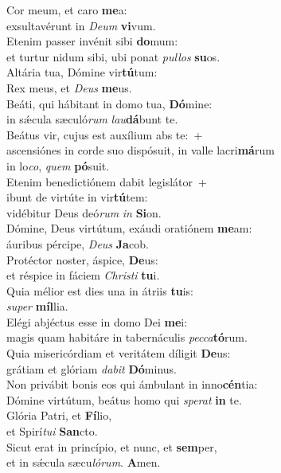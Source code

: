\evenverse Cor meum, et caro \textbf{me}a:~\*\\
\evenverse exsultavérunt in \textit{De}\textit{um} \textbf{vi}vum.\\
\oddverse Etenim passer invénit sibi \textbf{do}mum:~\*\\
\oddverse et turtur nidum sibi, ubi ponat \textit{pul}\textit{los} \textbf{su}os.\\
\evenverse Altária tua, Dómine vir\textbf{tú}tum:~\*\\
\evenverse Rex meus, et \textit{De}\textit{us} \textbf{me}us.\\
\oddverse Beáti, qui hábitant in domo tua, \textbf{Dó}mine:~\*\\
\oddverse in sǽcula sæculó\textit{rum} \textit{lau}\textbf{dá}bunt te.\\
\evenverse Beátus vir, cujus est auxílium abs te:~+\\
\evenverse  ascensiónes in corde suo dispósuit, in valle lacri\textbf{má}rum~\*\\
\evenverse in lo\textit{co}, \textit{quem} \textbf{pó}suit.\\
\oddverse Etenim benedictiónem dabit legislátor~+\\
\oddverse  ibunt de virtúte in vir\textbf{tú}tem:~\*\\
\oddverse vidébitur Deus deó\textit{rum} \textit{in} \textbf{Si}on.\\
\evenverse Dómine, Deus virtútum, exáudi oratiónem \textbf{me}am:~\*\\
\evenverse áuribus pércipe, \textit{De}\textit{us} \textbf{Ja}cob.\\
\oddverse Protéctor noster, áspice, \textbf{De}us:~\*\\
\oddverse et réspice in fáciem \textit{Chri}\textit{sti} \textbf{tu}i.\\
\evenverse Quia mélior est dies una in átriis \textbf{tu}is:~\*\\
\evenverse \textit{su}\textit{per} \textbf{míl}lia.\\
\oddverse Elégi abjéctus esse in domo Dei \textbf{me}i:~\*\\
\oddverse magis quam habitáre in tabernáculis \textit{pec}\textit{ca}\textbf{tó}rum.\\
\evenverse Quia misericórdiam et veritátem díligit \textbf{De}us:~\*\\
\evenverse grátiam et glóriam \textit{da}\textit{bit} \textbf{Dó}minus.\\
\oddverse Non privábit bonis eos qui ámbulant in inno\textbf{cén}tia:~\*\\
\oddverse Dómine virtútum, beátus homo qui \textit{spe}\textit{rat} \textbf{in} te.\\
\evenverse Glória Patri, et \textbf{Fí}lio,~\*\\
\evenverse et Spirí\textit{tu}\textit{i} \textbf{San}cto.\\
\oddverse Sicut erat in princípio, et nunc, et \textbf{sem}per,~\*\\
\oddverse et in sǽcula sæcu\textit{ló}\textit{rum}. \textbf{A}men.\\
